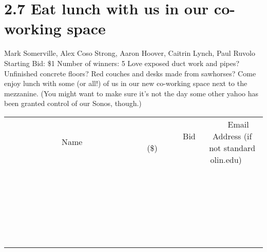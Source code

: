 \documentclass[11pt]{article}
\begin{document}
\section*{2.7 Eat lunch with us in our co-working space }
Mark Somerville, Alex Coso Strong, Aaron Hoover, Caitrin Lynch, Paul Ruvolo
\\
Starting Bid: \$1
\newline
Number of winners: 5
\newline
Love exposed duct work and pipes? Unfinished concrete floors? Red couches and desks made from sawhorses? Come enjoy lunch with some (or all!) of us in our new co-working space next to the mezzanine. (You might want to make sure it's not the day some other yahoo has been granted control of our Sonos, though.)
\\[6ex]
\begin{tabular}{c c c}
~~~~~~~~~~~~~Name~~~~~~~~~~~~~ & ~~~~~~~~~Bid (\$)~~~~~~~~~  & ~~~Email Address (if not standard olin.edu)~~~\\
 & & \\
\hline
 & & \\
\hline
 & & \\
\hline
 & & \\
\hline
 & & \\
\hline
 & & \\
\hline
 & & \\
\hline
 & & \\
\hline
 & & \\
\hline
 & & \\
\hline
 & & \\
\hline
 & & \\
\hline
 & & \\
\hline
 & & \\
\hline
 & & \\
\hline
 & & \\
\hline
 & & \\
\hline
 & & \\
\hline
 & & \\
\hline
 & & \\
\hline
 & & \\
\hline
 & & \\
\hline
 & & \\
\hline
 & & \\
\hline
 & & \\
\hline
 & & \\
\hline
\end{tabular}
\newpage
\end{document}
